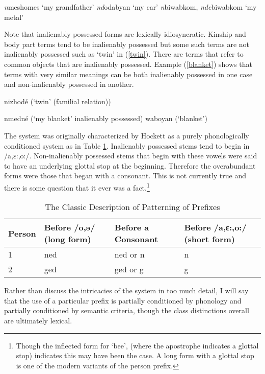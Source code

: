 \pex
\a\label{granpa} {\it n}meshomes `my grandfather'
\a\label{car} {\it nd}odabyan `my car'
\a\label{metal} {\it n}biwabkom, {\it nde}biwabkom `my metal'
\xe

Note that inalienably possessed forms are lexically
idiosyncratic. Kinship and body part terms tend to be inalienably
possessed but some such terms are not inalienably possessed such as
`twin' in (\ref{twin}). There are terms that refer to common objects
that are inalienably possessed. Example (\ref{blanket}) shows that
terms with very similar meanings can be both inalienably possessed in
one case and non-inalienably possessed in another.

\ex\label{twin} nizhodé (`twin' (familial relation))\xe

\pex\label{blanket}
\a\label{blanket1} nmedné (`my blanket' inalienably possessed)
\a\label{blanket2} waboyan (`blanket')
\xe

The system was originally characterized by Hockett as a purely
phonologically conditioned system as in Table
\ref{prefixes}. Inalienably possessed stems tend to begin in
/a,ɛ:,o:/. Non-inalienably possessed stems that begin with these
vowels were said to have an underlying glottal stop at the
beginning. Therefore the overabundant forms were those that began with
a consonant. This is not currently true and there is some question
that it ever was a fact.\footnote{Though the inflected form for `bee',
  (where the apostrophe indicates a glottal stop) indicates this may
  have been the case. A long form with a glottal stop is one of the
  modern variants of the person prefix.}

\begin{table}[H]
\begin{center}
\begin{tabular}{lp{4cm}p{4cm}p{4cm}}
Person             & Before /o,ə/ (long form) & Before a Consonant & Before /a,ɛ:,o:/ (short form) \\
\hline
1                  & ned        & ned or n  & n            \\
2                  & ged        & ged or g  & g            \\
\end{tabular}
\caption{The Classic Description of Patterning of Prefixes}
\label{prefixes}
\end{center}
\end{table}

Rather than discuss the intricacies of the system in too much detail,
I will say that the use of a particular prefix is partially
conditioned by phonology and partially conditioned by semantic
criteria, though the class distinctions overall are ultimately
lexical.

